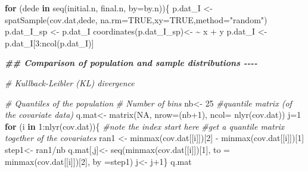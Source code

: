 \documentclass[
]{book}
\newenvironment{Shaded}{\begin{snugshade}}{\end{snugshade}}
\newcommand{\AttributeTok}[1]{\textcolor[rgb]{0.77,0.63,0.00}{#1}}
\newcommand{\CommentTok}[1]{\textcolor[rgb]{0.56,0.35,0.01}{\textit{#1}}}
\newcommand{\ConstantTok}[1]{\textcolor[rgb]{0.00,0.00,0.00}{#1}}
\newcommand{\ControlFlowTok}[1]{\textcolor[rgb]{0.13,0.29,0.53}{\textbf{#1}}}
\newcommand{\DecValTok}[1]{\textcolor[rgb]{0.00,0.00,0.81}{#1}}
\newcommand{\DocumentationTok}[1]{\textcolor[rgb]{0.56,0.35,0.01}{\textbf{\textit{#1}}}}
\newcommand{\ErrorTok}[1]{\textcolor[rgb]{0.64,0.00,0.00}{\textbf{#1}}}
\newcommand{\FunctionTok}[1]{\textcolor[rgb]{0.00,0.00,0.00}{#1}}
\newcommand{\NormalTok}[1]{#1}
\newcommand{\OtherTok}[1]{\textcolor[rgb]{0.56,0.35,0.01}{#1}}
\newcommand{\SpecialCharTok}[1]{\textcolor[rgb]{0.00,0.00,0.00}{#1}}
\newcommand{\StringTok}[1]{\textcolor[rgb]{0.31,0.60,0.02}{#1}}
\begin{document}
\begin{Shaded}
\begin{Highlighting}[]
  \ControlFlowTok{for}\NormalTok{ (dede }\ControlFlowTok{in} \FunctionTok{seq}\NormalTok{(initial.n, final.n, }\AttributeTok{by=}\NormalTok{by.n))\{}
\NormalTok{    p.dat\_I }\OtherTok{\textless{}{-}} \FunctionTok{spatSample}\NormalTok{(cov.dat,dede, }\AttributeTok{na.rm=}\ConstantTok{TRUE}\NormalTok{,}\AttributeTok{xy=}\ConstantTok{TRUE}\NormalTok{,}\AttributeTok{method=}\StringTok{"random"}\NormalTok{)}
\NormalTok{    p.dat\_I\_sp }\OtherTok{\textless{}{-}}\NormalTok{  p.dat\_I }
    \FunctionTok{coordinates}\NormalTok{(p.dat\_I\_sp)}\OtherTok{\textless{}{-}} \ErrorTok{\textasciitilde{}}\NormalTok{ x }\SpecialCharTok{+}\NormalTok{ y }
\NormalTok{    p.dat\_I }\OtherTok{\textless{}{-}}\NormalTok{ p.dat\_I[}\DecValTok{3}\SpecialCharTok{:}\FunctionTok{ncol}\NormalTok{(p.dat\_I)]}
  
  
  \DocumentationTok{\#\# Comparison of population and sample distributions {-}{-}{-}{-}}
  
    \CommentTok{\# Kullback{-}Leibler (KL) divergence}
    
    \CommentTok{\# Quantiles of the population}
    \CommentTok{\# Number of bins}
\NormalTok{    nb}\OtherTok{\textless{}{-}} \DecValTok{25}
    \CommentTok{\#quantile matrix (of the covariate data)}
\NormalTok{    q.mat}\OtherTok{\textless{}{-}} \FunctionTok{matrix}\NormalTok{(}\ConstantTok{NA}\NormalTok{, }\AttributeTok{nrow=}\NormalTok{(nb}\SpecialCharTok{+}\DecValTok{1}\NormalTok{), }\AttributeTok{ncol=} \FunctionTok{nlyr}\NormalTok{(cov.dat))}
\NormalTok{    j}\OtherTok{=}\DecValTok{1}
    \ControlFlowTok{for}\NormalTok{ (i }\ControlFlowTok{in} \DecValTok{1}\SpecialCharTok{:}\FunctionTok{nlyr}\NormalTok{(cov.dat))\{ }\CommentTok{\#note the index start here}
      \CommentTok{\#get a quantile matrix together of the covariates}
\NormalTok{      ran1 }\OtherTok{\textless{}{-}} \FunctionTok{minmax}\NormalTok{(cov.dat[[i]])[}\DecValTok{2}\NormalTok{] }\SpecialCharTok{{-}} \FunctionTok{minmax}\NormalTok{(cov.dat[[i]])[}\DecValTok{1}\NormalTok{]}
\NormalTok{      step1}\OtherTok{\textless{}{-}}\NormalTok{ ran1}\SpecialCharTok{/}\NormalTok{nb }
\NormalTok{      q.mat[,j]}\OtherTok{\textless{}{-}} \FunctionTok{seq}\NormalTok{(}\FunctionTok{minmax}\NormalTok{(cov.dat[[i]])[}\DecValTok{1}\NormalTok{], }\AttributeTok{to =} \FunctionTok{minmax}\NormalTok{(cov.dat[[i]])[}\DecValTok{2}\NormalTok{], }\AttributeTok{by =}\NormalTok{step1)}
\NormalTok{      j}\OtherTok{\textless{}{-}}\NormalTok{ j}\SpecialCharTok{+}\DecValTok{1}\NormalTok{\}}
\NormalTok{    q.mat}
    

\end{Highlighting}
\end{Shaded}
\end{document}
